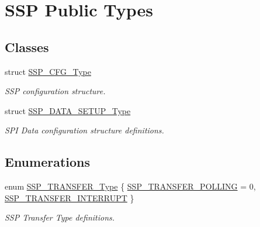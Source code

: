 \hypertarget{group___s_s_p___public___types}{\section{\-S\-S\-P \-Public \-Types}
\label{group___s_s_p___public___types}
}
\subsection*{\-Classes}
\begin{DoxyCompactItemize}
\item 
struct \hyperlink{struct_s_s_p___c_f_g___type}{\-S\-S\-P\-\_\-\-C\-F\-G\-\_\-\-Type}
\begin{DoxyCompactList}\small\item\em \-S\-S\-P configuration structure. \end{DoxyCompactList}\item 
struct \hyperlink{struct_s_s_p___d_a_t_a___s_e_t_u_p___type}{\-S\-S\-P\-\_\-\-D\-A\-T\-A\-\_\-\-S\-E\-T\-U\-P\-\_\-\-Type}
\begin{DoxyCompactList}\small\item\em \-S\-P\-I \-Data configuration structure definitions. \end{DoxyCompactList}\end{DoxyCompactItemize}
\subsection*{\-Enumerations}
\begin{DoxyCompactItemize}
\item 
enum \hyperlink{group___s_s_p___public___types_ga34f9cea91f43d14807778072c5f3c20f}{\-S\-S\-P\-\_\-\-T\-R\-A\-N\-S\-F\-E\-R\-\_\-\-Type} \{ \hyperlink{group___s_s_p___public___types_gga34f9cea91f43d14807778072c5f3c20facbf9f348aff60d888fc8d156c57dd17e}{\-S\-S\-P\-\_\-\-T\-R\-A\-N\-S\-F\-E\-R\-\_\-\-P\-O\-L\-L\-I\-N\-G} =  0, 
\hyperlink{group___s_s_p___public___types_gga34f9cea91f43d14807778072c5f3c20fad400016c53e56670b957e0b09638c7a2}{\-S\-S\-P\-\_\-\-T\-R\-A\-N\-S\-F\-E\-R\-\_\-\-I\-N\-T\-E\-R\-R\-U\-P\-T}
 \}
\begin{DoxyCompactList}\small\item\em \-S\-S\-P \-Transfer \-Type definitions. \end{DoxyCompactList}\end{DoxyCompactItemize}



